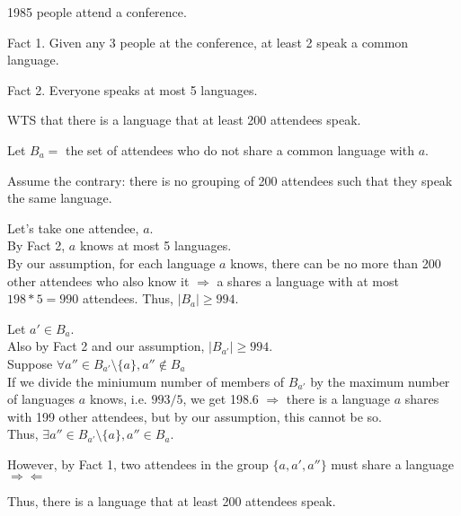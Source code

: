 \documentclass[fleqn]{article}
\begin{document}
1985 people attend a conference.

Fact 1. Given any 3 people at the conference, 
at least 2 speak a common language.

Fact 2. Everyone speaks at most 5 languages.

WTS that there is a language that at least 200 attendees speak.

Let $B_a = $ the set of attendees who do not share a common language with $a$.

Assume the contrary: there is no grouping of 200 attendees such that they speak the same language.

Let's take one attendee, $a$.\\
By Fact 2, $a$ knows at most 5 languages.\\
By our assumption, for each language $a$ knows, there can be no more than 200 other attendees who also know it $\Rightarrow$ a shares a language with at most $198*5=990$ attendees. Thus, $|B_a| \geq 994$.

Let $a' \in B_a$.\\
Also by Fact 2 and our assumption, $|B_{a'}| \geq 994$.\\
Suppose $\forall a'' \in B_{a'}\setminus \lbrace a \rbrace, 
          a'' \not\in B_a$\\
If we divide the miniumum number of members of $B_{a'}$ by the maximum
number of languages $a$ knows, i.e. $993/5$, we get 198.6 $\Rightarrow$ there is a language $a$ shares with 199 other attendees, but by our assumption, this cannot be so.\\
Thus, $\exists a'' \in B_{a'}\setminus \lbrace a \rbrace,
        a'' \in B_a$.

However, by Fact 1, two attendees in the group 
$\lbrace a, a', a'' \rbrace$ must share a language 
$\Rightarrow \Leftarrow$

Thus, there is a language that at least 200 attendees speak.
\end{document}
